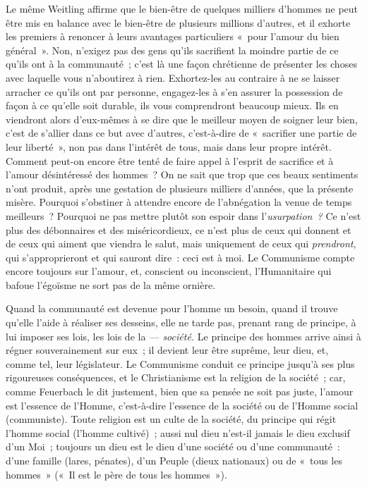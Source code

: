\documentclass[french,twoside]{book} %
\begin{document}
Le même Weitling affirme que le bien-être de  quelques milliers d’hommes ne peut être mis en balance avec le bien-être de plusieurs millions d’autres, et il exhorte les premiers à renoncer à leurs avantages particuliers « pour l’amour du bien général ». Non, n’exigez pas des gens qu’ils sacrifient la moindre partie de ce qu’ils ont à la communauté ; c’est là une façon chrétienne de présenter les choses avec laquelle vous n’aboutirez à rien. Exhortez-les au contraire à ne se laisser arracher ce qu’ils ont par personne, engagez-les à s’en assurer la possession de façon à ce qu’elle soit durable, ils vous comprendront beaucoup mieux. Ils en viendront alors d’eux-mêmes à se dire que le meilleur moyen de soigner leur bien, c’est de s’allier dans ce but avec d’autres, c’est-à-dire de « sacrifier une partie de leur liberté », non pas dans l’intérêt de tous, mais dans leur propre intérêt. Comment peut-on encore être tenté de faire appel à l’esprit de sacrifice et à l’amour désintéressé des hommes ? On ne sait que trop que ces beaux sentiments n’ont produit, après une gestation de plusieurs milliers d’années, que la présente misère. Pourquoi s’obstiner à attendre encore de l’abnégation la venue de temps meilleurs ? Pourquoi ne pas mettre plutôt son espoir dans l’\emph{usurpation ?} Ce n’est plus des débonnaires et des miséricordieux, ce n’est plus de ceux qui donnent et de ceux qui aiment que viendra le salut, mais uniquement de ceux qui \emph{prendront}, qui s’approprieront et qui sauront dire : ceci est à moi. Le Communisme compte encore toujours sur l’amour, et, conscient ou inconscient, l’Humanitaire qui bafoue l’égoïsme ne sort pas de la même ornière.\par
Quand la communauté est devenue pour l’homme un besoin, quand il trouve qu’elle l’aide à réaliser ses desseins, elle ne tarde pas, prenant rang de principe, à lui imposer ses lois, les lois de la \emph{ — société.} Le principe des hommes arrive ainsi à régner souverainement sur eux ; il devient leur être suprême, leur dieu, et, comme  tel, leur législateur. Le Communisme conduit ce principe jusqu’à ses plus rigoureuses conséquences, et le Christianisme est la religion de la société ; car, comme Feuerbach le dit justement, bien que sa pensée ne soit pas juste, l’amour est l’essence de l’Homme, c’est-à-dire l’essence de la société ou de l’Homme social (communiste). Toute religion est un culte de la société, du principe qui régit l’homme social (l’homme cultivé) ; aussi nul dieu n’est-il jamais le dieu exclusif d’un Moi ; toujours un dieu est le dieu d’une société ou d’une communauté : d’une famille (lares, pénates), d’un Peuple (dieux nationaux) ou de « tous les hommes » (« Il est le père de tous les hommes »).\par
\end{document}
